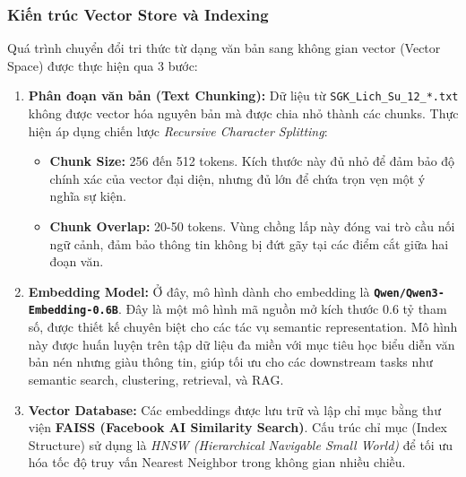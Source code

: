 \subsubsection{Kiến trúc Vector Store và Indexing}
Quá trình chuyển đổi tri thức từ dạng văn bản sang không gian vector (Vector Space) được thực hiện qua 3 bước:
\begin{enumerate}
    \item \textbf{Phân đoạn văn bản (Text Chunking):}
    Dữ liệu từ \texttt{SGK\_Lich\_Su\_12\_*.txt} không được vector hóa nguyên bản mà được chia nhỏ thành các chunks. Thực hiện áp dụng chiến lược \textit{Recursive Character Splitting}:
    \begin{itemize}
        \item \textbf{Chunk Size:} 256 đến 512 tokens. Kích thước này đủ nhỏ để đảm bảo độ chính xác của vector đại diện, nhưng đủ lớn để chứa trọn vẹn một ý nghĩa sự kiện.
        \item \textbf{Chunk Overlap:} 20-50 tokens. Vùng chồng lấp này đóng vai trò cầu nối ngữ cảnh, đảm bảo thông tin không bị đứt gãy tại các điểm cắt giữa hai đoạn văn.
    \end{itemize}
    \item \textbf{Embedding Model:}
    Ở đây, mô hình dành cho embedding là \textbf{\texttt{Qwen/Qwen3-Embedding-0.6B}}. Đây là một mô hình mã nguồn mở kích thước 0.6 tỷ tham số, được thiết kế chuyên biệt cho các tác vụ semantic representation. Mô hình này được huấn luyện trên tập dữ liệu đa miền với mục tiêu học biểu diễn văn bản nén nhưng giàu thông tin, giúp tối ưu cho các downstream tasks như semantic search, clustering, retrieval, và RAG.
    
    \item \textbf{Vector Database:}
    Các embeddings được lưu trữ và lập chỉ mục bằng thư viện \textbf{FAISS (Facebook AI Similarity Search)}. Cấu trúc chỉ mục (Index Structure) sử dụng là \textit{HNSW (Hierarchical Navigable Small World)} để tối ưu hóa tốc độ truy vấn Nearest Neighbor trong không gian nhiều chiều.
\end{enumerate}
